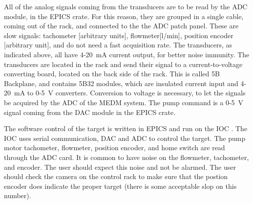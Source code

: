 {


All of the analog signals coming from the transducers are to be read
by the ADC module, in the EPICS crate. For this reason, they are grouped
in a single cable, coming out of the rack, and connected to the the
ADC patch panel. These are slow signals: tachometer {[}arbitrary units{]},
flowmeter{[}l/min{]}, position encoder {[}arbitrary unit{]}, and do
not need a fast acquisition rate. The transducers, as indicated above,
all have 4-20~mA current output, for better noise immunity. The transducers
are located in the rack and send their signal to a current-to-voltage
converting board, located on the back side of the rack. This is called
5B Backplane, and contains 5B32 modules, which are insulated current
input and 4-20~mA to 0-5~V converters. Conversion to voltage is
necessary, to let the signals be acquired by the ADC of the MEDM system.
The pump command is a 0-5~V signal coming from the DAC module in
the EPICS crate.

The software control of the target is written in EPICS and run on
the IOC . The IOC uses serial communication, DAC
and ADC to control the target. The pump motor tachometer, flowmeter,
position encoder, and home switch are read through the ADC card. It
is common to have noise on the flowmeter, tachometer, and encoder.
The user should expect this noise and not be alarmed. The user should
check the camera on the control rack to make sure that the postion
encoder does indicate the proper target (there is some acceptable
slop on this number).

}
